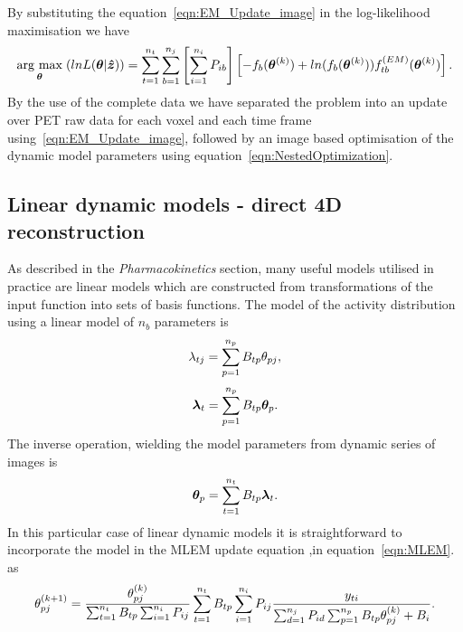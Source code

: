 By substituting the equation~\ref{eqn:EM_Update_image} in the log-likelihood maximisation we have
\begin{equation}
\underset{\bm{\theta}}{\operatorname{arg}\,\operatorname{max}}\;(lnL(\bm{\theta}|\bm{\hat{z}})) = 
\sum_{t=1}^{n_t} \sum_{b=1}^{n_j} \left[ \sum_{i=1}^{n_i}  P_{ib} \right]
\left[ -f_b(\bm\theta^{(k)}) + 
ln( f_b(\bm\theta^{(k)})) 
f_{tb}^{(EM)}(\bm{\theta}^{(k)})
\right] \\ .
\label{eqn:NestedOptimization}
\end{equation}
By the use of the complete data we have separated the problem into an update over PET raw data for each voxel and each time frame using~\ref{eqn:EM_Update_image}, followed by an image based optimisation of the dynamic model parameters using equation~\ref{eqn:NestedOptimization}. 

\subsection{Linear dynamic models - direct 4D reconstruction}
As described in the \textit{Pharmacokinetics} section, many useful models utilised in practice are linear models which are constructed from transformations of the input function into sets of basis functions.
The model of the activity distribution using a linear model of $n_b$ parameters is
\begin{equation}
\lambda_{tj} = \sum_{p=1}^{n_p} B_{tp}   \theta_{pj} \\, 
\label{eqn:2_3_LinearBasis}
\end{equation}
\begin{equation}
\bm\lambda_{t} = \sum_{p=1}^{n_p} B_{tp}  \bm\theta_{p}  \\.
\end{equation}
The inverse operation, wielding the model parameters from dynamic series of images is
\begin{equation}
\bm\theta_{p}  = \sum_{t=1}^{n_t} B_{tp} \bm\lambda_{t}  \\.
\end{equation}
In this particular case of linear dynamic models it is straightforward to incorporate the model in the MLEM update equation ,in equation~\ref{eqn:MLEM}. as
%
%
%
\begin{equation}
\theta_{pj}^{(k+1)} = \frac{\theta_{pj}^{(k)}}
{\sum_{t=1}^{n_t} B_{tp} \sum_{i=1}^{n_i} P_{ij}} 
\sum_{t=1}^{n_t} B_{tp} \sum_{i=1}^{n_i} P_{ij}
\frac{y_{ti}}
{\sum_{d=1}^{n_j} P_{id} \sum_{p=1}^{n_p} B_{tp}\theta_{pj}^{(k)} + B_i } \\.
\label{eqn:4DMLEM}
\end{equation} 
%
%
%
